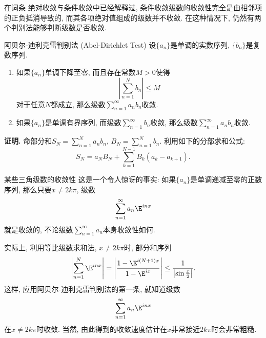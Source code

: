 

在词条 绝对收敛与条件收敛中已经解释过, 条件收敛级数的收敛性完全是由相邻项的正负抵消导致的, 而其各项绝对值组成的级数并不收敛. 在这种情况下, 仍然有两个判别法能够判断级数是否收敛.

\begin{theorem}{阿贝尔-迪利克雷判别法 (Abel-Dirichlet Test)}
设$\{a_n\}$是单调的实数序列, $\{b_n\}$是复数序列.

\begin{enumerate}
\item 如果$\{a_n\}$单调下降至零, 而且存在常数$M>0$使得
$$
\left|\sum_{n=1}^N b_n\right|\leq M
$$
对于任意$N$都成立, 那么级数$\sum_{n=1}^\infty a_nb_n$收敛.

\item 如果$\{a_n\}$是单调有界序列, 而级数$\sum_{n=1}^\infty b_n$收敛, 那么级数$\sum_{n=1}^\infty a_nb_n$收敛.
\end{enumerate}
\end{theorem}

\textbf{证明.} 命部分和$S_N=\sum_{n=1}^N a_nb_n$, $B_N=\sum_{n=1}^N b_n$. 利用如下的分部求和公式:
$$
S_N=a_NB_N+\sum_{k=1}^{N-1}B_k(a_{k}-a_{k+1}).
$$

\begin{example}{某些三角级数的收敛性}
这是一个令人惊讶的事实: 如果$\{a_n\}$是单调递减至零的正数序列, 那么只要$x\neq 2k\pi$, 级数
$$
\sum_{n=1}^\infty a_n \E^{inx}
$$
就是收敛的, 不论级数$\sum_{n=1}^\infty a_n$本身收敛性如何.

实际上, 利用等比级数求和法, $x\neq 2k\pi$时, 部分和序列
$$
\left|\sum_{n=1}^N\E^{inx}\right|
=\left|\frac{1-\E^{i(N+1)x}}{1-\E^{ix}}\right|
\leq\frac{1}{\left|\sin\frac{x}{2}\right|}.
$$
这样, 应用阿贝尔-迪利克雷判别法的第一条, 就知道级数
$$
\sum_{n=1}^\infty a_n \E^{inx}
$$
在$x\neq 2k\pi$时收敛. 当然, 由此得到的收敛速度估计在$x$非常接近$2k\pi$时会非常粗糙.
\end{example}
